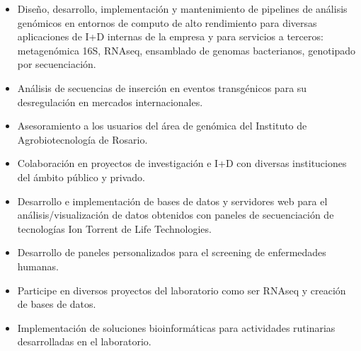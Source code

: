 \documentclass[10pt,a4paper,ragged2e]{altacv}
\begin{document}
\divider
{}

\begin{itemize}
\item Diseño, desarrollo, implementación y mantenimiento de pipelines de análisis genómicos en entornos de computo de
alto rendimiento para diversas aplicaciones de I+D internas de la empresa y para servicios a terceros: metagenómica 16S, RNAseq, ensamblado de genomas bacterianos, genotipado por secuenciación.
\item Análisis de secuencias de inserción en eventos transgénicos para su desregulación en mercados internacionales.
\item Asesoramiento a los usuarios del área de genómica del Instituto de Agrobiotecnología de Rosario.
\end{itemize}


\begin{itemize}
\item Colaboración en proyectos de investigación e I+D con diversas instituciones del ámbito público y privado.
\item Desarrollo e implementación de bases de datos y servidores web para el análisis/visualización de datos obtenidos con
paneles de secuenciación de tecnologías Ion Torrent de Life Technologies.
\item Desarrollo de paneles personalizados para el screening de enfermedades humanas.
\end{itemize}

\divider


\begin{itemize}
\item Participe en diversos proyectos del laboratorio como ser RNAseq y creación de bases de datos.
\item Implementación de soluciones bioinformáticas para actividades rutinarias desarrolladas en el laboratorio.
\end{itemize}

\end{document}
